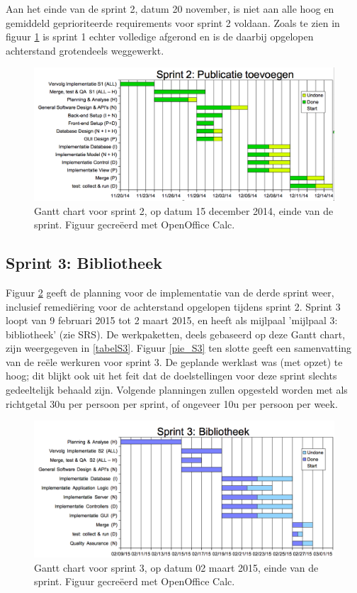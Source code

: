 \documentclass{article}
\begin{document}
\noindent Aan het einde van de sprint 2, datum 20 november, is niet aan alle hoog en gemiddeld geprioriteerde requirements voor sprint 2 voldaan. Zoals te zien in figuur \ref{gantt_S2_15dec} is sprint 1 echter volledige afgerond en is de daarbij opgelopen achterstand grotendeels weggewerkt. 

\begin{figure}[h!]
\centering
 \centerline{\includegraphics[scale=0.4]{Gantt_S2_15dec.png}}
 \caption{Gantt chart voor sprint 2, op datum 15 december 2014, einde van de sprint. Figuur gecre\"{e}erd met OpenOffice Calc.}
 \label{gantt_S2_15dec}
\end{figure}

\clearpage
\subsection{Sprint 3:  Bibliotheek}

Figuur \ref{gantt_S3_2maart} geeft de planning voor de implementatie van de derde sprint weer, inclusief remedi\"{e}ring voor de achterstand opgelopen tijdens sprint 2. Sprint 3 loopt van 9 februari 2015  tot 2 maart 2015, en heeft als mijlpaal 'mijlpaal 3: bibliotheek' (zie SRS). De werkpaketten, deels gebaseerd op deze Gantt chart, zijn weergegeven in \ref{tabelS3}. Figuur \ref{pie_S3} ten slotte geeft een samenvatting van de re\"{e}le werkuren voor sprint 3. De geplande werklast was (met opzet) te hoog; dit blijkt ook uit het feit dat de doelstellingen voor deze sprint slechts gedeeltelijk behaald zijn. Volgende planningen zullen opgesteld worden met als richtgetal 30u per persoon per sprint, of ongeveer 10u per persoon per week. 

\begin{figure}[h!]
\centering
 \centerline{\includegraphics[scale=0.4]{Gantt_S3_2maart.png}}
 \caption{Gantt chart voor sprint 3, op datum 02 maart 2015, einde van de sprint. Figuur gecre\"{e}erd met OpenOffice Calc.}
 \label{gantt_S3_2maart}
\end{figure}
\end{document}
